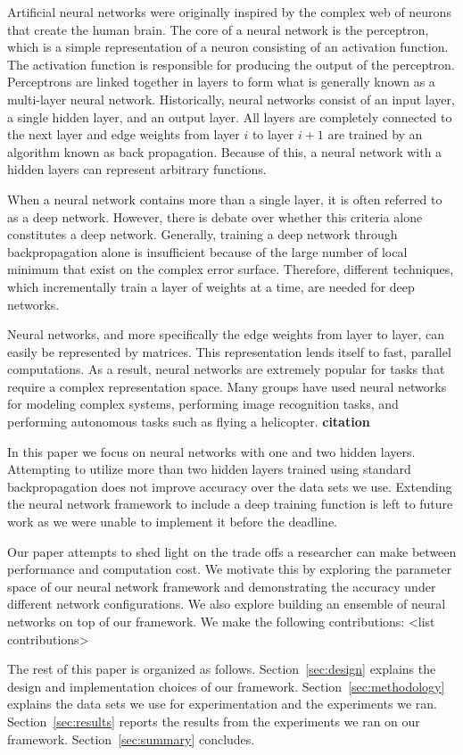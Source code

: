 Artificial neural networks were originally inspired by the complex web of neurons that create the human brain.
The core of a neural network is the perceptron, which is a simple representation of a neuron consisting of an activation function.
The activation function is responsible for producing the output of the perceptron.
Perceptrons are linked together in layers to form what is generally known as a multi-layer neural network.
Historically, neural networks consist of an input layer, a single hidden layer, and an output layer.
All layers are completely connected to the next layer and edge weights from layer \(i\) to layer \(i+1\) are trained by an algorithm known as back propagation.
Because of this, a neural network with a hidden layers can represent arbitrary functions.

When a neural network contains more than a single layer, it is often referred to as a deep network.
However, there is debate over whether this criteria alone constitutes a deep network.
Generally, training a deep network through backpropagation alone is insufficient because of the large number of local minimum that exist on the complex error surface.
Therefore, different techniques, which incrementally train a layer of weights at a time, are needed for deep networks.

Neural networks, and more specifically the edge weights from layer to layer, can easily be represented by matrices.
This representation lends itself to fast, parallel computations.
As a result, neural networks are extremely popular for tasks that require a complex representation space.
Many groups have used neural networks for modeling complex systems, performing image recognition tasks, and performing autonomous tasks such as flying a helicopter. {\bf citation}

In this paper we focus on neural networks with one and two hidden layers.
Attempting to utilize more than two hidden layers trained using standard backpropagation does not improve accuracy over the data sets we use.
Extending the neural network framework to include a deep training function is left to future work as we were unable to implement it before the deadline.

Our paper attempts to shed light on the trade offs a researcher can make between performance and computation cost.
We motivate this by exploring the parameter space of our neural network framework and demonstrating the accuracy under different network configurations.
We also explore building an ensemble of neural networks on top of our framework.
We make the following contributions: <list contributions>

The rest of this paper is organized as follows.
Section~\ref{sec:design} explains the design and implementation choices of our framework.
Section~\ref{sec:methodology} explains the data sets we use for experimentation and the experiments we ran.
Section~\ref{sec:results} reports the results from the experiments we ran on our framework.
Section~\ref{sec:summary} concludes.
